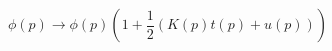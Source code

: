 \begin{equation}
\phi (p) \longrightarrow \phi (p) \left( 1 + \frac{1}{2} ( K(p) t(p) +
u(p) ) \right)
\end{equation}

